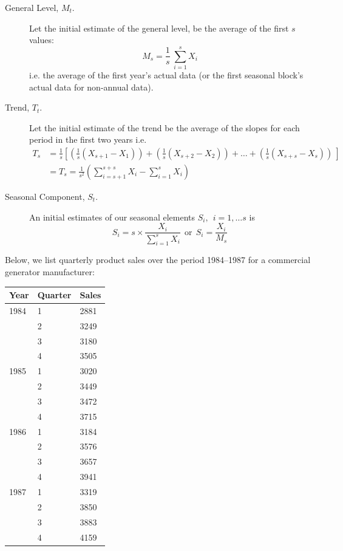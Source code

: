 \documentclass[12pt,a4paper,openany,twoside]{report}
\theoremstyle{definition}
\theoremstyle{remark}
\theoremstyle{plain}
\newcommand{\vsps}{\vspace{.5cm}}
\theoremstyle{definition}
\theoremstyle{definition}
\theoremstyle{definition}
\theoremstyle{remark}
\let\BeginKnitrBlock\begin \let\EndKnitrBlock\end
\begin{document}
\begin{description}
\item[General Level, $M_t$.]

Let the initial estimate of the general level, be the average of the
first $s$ values:
\[M_{s} = \frac{1}{s}\ \sum_{i = 1}^{s}X_{i}\]
i.e. the average of the first year's actual data (or the first seasonal block's actual data for non-annual data).

\item[Trend, $T_t$.]

Let the initial estimate of the trend be the average of the slopes for
each period in the first two years i.e.
\begin{align*}
T_{s} & = \frac{1}{s}\left\lbrack \left( \frac{1}{s}\left( X_{s + 1} - X_{1} \right) \right) + \left( \frac{1}{s}\left( X_{s + 2} - X_{2} \right) \right) + \ldots 
+ \left( \frac{1}{s}\left( X_{s + s} - X_{s} \right) \right)\  \right\rbrack \\
&  = T_{s} = \frac{1}{s^{2}}\left( \sum_{i = s + 1}^{s + s}X_{i} - \sum_{i = 1}^{s}X_{i} \right)
\end{align*}

\item[Seasonal Component, $S_t$.]

An initial estimates of our seasonal elements
\(S_{i},\ \ i = 1,\ldots s\) is
\[S_{i} = s\times\frac{X_{i}}{\sum_{i = 1}^{s}X_{i}} \ \ \text{or} \ \ S_{i} = \frac{X_{i}}{M_{s}}\]
\end{description}
\vsps

\BeginKnitrBlock{example}[Generator sales]
\protect\hypertarget{exm:generator}{}{\label{exm:generator} {} }Below, we list quarterly product sales over the period 1984--1987 for a commercial
generator manufacturer:\newline

\begin{longtable}[c]{@{}lll@{}}
\toprule
Year & Quarter &
Sales\tabularnewline
\midrule
\endhead
1984 & 1 & 2881\tabularnewline
& 2 & 3249\tabularnewline
& 3 & 3180\tabularnewline
& 4 & 3505\tabularnewline
1985 & 1 & 3020\tabularnewline
& 2 & 3449\tabularnewline
& 3 & 3472\tabularnewline
& 4 & 3715\tabularnewline
1986 & 1 & 3184\tabularnewline
& 2 & 3576\tabularnewline
& 3 & 3657\tabularnewline
& 4 & 3941\tabularnewline
1987 & 1 & 3319\tabularnewline
& 2 & 3850\tabularnewline
& 3 & 3883\tabularnewline
& 4 & 4159\tabularnewline
\bottomrule
\end{longtable}
\EndKnitrBlock{example}
\vsps
\end{document}
